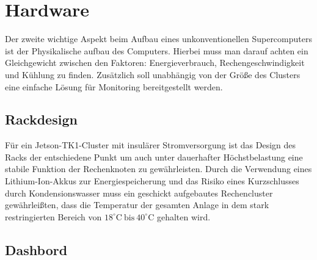 \section{Hardware}
Der zweite wichtige Aspekt beim Aufbau eines unkonventionellen 
Supercomputers ist der Physikalische aufbau des Computers.
Hierbei muss man darauf achten ein Gleichgewicht zwischen den Faktoren: 
Energieverbrauch, Rechengeschwindigkeit und Kühlung zu finden.
Zusätzlich soll unabhängig von der Größe des Clusters eine
einfache Lösung für Monitoring bereitgestellt werden.


\subsection{Rackdesign}
Für ein Jetson-TK1-Cluster mit insulärer Stromversorgung
ist das Design des Racks der entschiedene Punkt um 
auch unter dauerhafter Höchstbelastung eine
stabile Funktion der Rechenknoten zu gewährleisten.
Durch die Verwendung eines Lithium-Ion-Akkus zur Energiespeicherung
und das Risiko eines Kurzschlusses durch Kondensionswasser muss
ein geschickt aufgebautes Rechencluster gewährleißten, dass die Temperatur
der gesamten Anlage in dem stark restringierten Bereich von 
$18^\circ\text{C}~\text{bis}~40^\circ \text{C}$ gehalten wird. 




\subsection{Dashbord}
